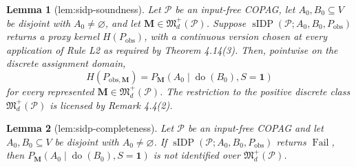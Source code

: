 \documentclass{article}
\newtheorem{lemma}{Lemma}
\begin{document}
\begin{lemma}[lem:sidp-soundness]\label{lem:sidp-soundness}
Let \(\mathcal P\) be an input-free COPAG, let \(A_0,B_0\subseteq V\) be disjoint with \(A_0\neq\varnothing\), and let \(\mathbf M\in\mathfrak M_d^+(\mathcal P)\). Suppose \(\operatorname{sIDP}(\mathcal P;A_0,B_0,P_{\mathrm{obs}})\) returns a proxy kernel \(H(P_{\mathrm{obs}})\), with a continuous version chosen at every application of Rule L2 as required by Theorem 4.14(3). Then, pointwise on the discrete assignment domain,
\[
 H(P_{\mathrm{obs},\mathbf M})
 =P_{\mathbf M}(A_0\mid\operatorname{do}(B_0),S=\mathbf 1)
\]
for every represented \(\mathbf M\in\mathfrak M_d^+(\mathcal P)\). The restriction to the positive discrete class \(\mathfrak M_d^+(\mathcal P)\) is licensed by Remark 4.4(2).
\end{lemma}

\begin{lemma}[lem:sidp-completeness]\label{lem:sidp-completeness}
Let \(\mathcal P\) be an input-free COPAG and let \(A_0,B_0\subseteq V\) be disjoint with \(A_0\neq\varnothing\).  If \(\operatorname{sIDP}(\mathcal P;A_0,B_0,P_{\mathrm{obs}})\) returns \(\operatorname{Fail}\), then \(P_{\mathbf M}(A_0\mid\operatorname{do}(B_0),S=\mathbf 1)\) is not identified over \(\mathfrak M_d^+(\mathcal P)\).
\end{lemma}
\end{document}
